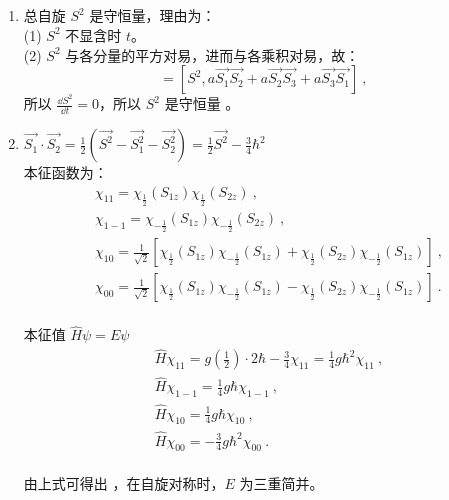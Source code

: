 \subsection{ }
\begin{enumerate}
\item 总自旋 $S^2$ 是守恒量，理由为：\\
(1) $S^2$ 不显含时 $t$。\\
(2) $S^2$ 与各分量的平方对易，进而与各乘积对易，故：\\
\begin{equation}
[S^2 ,H^2] = [S^2 , a \vec{S_1} \vec{S_2} + a \vec{S_2} \vec{S_3} + a \vec{S_3} \vec{S_1}]~,
\end{equation}
所以 $\frac{\dd{S^2}}{\dd{t}}=0$，所以 $S^2$ 是守恒量 。

\item $\displaystyle \vec{S_1} \cdot \vec{S_2} = \frac{1}{2} (\vec{S^2} -\vec{S^2_1} -\vec{S^2_2}) = \frac{1}{2} \vec{S^2} - \frac{3}{4} \hbar^2 $ \\

本征函数为：\\
\begin{equation}
\begin{aligned}
& \chi_{11} = \chi_{\frac{1}{2}}(S_{1z})\chi_{\frac{1}{2}}(S_{2z})~, \\
& \chi_{1-1} = \chi_{-\frac{1}{2}}(S_{1z})\chi_{-\frac{1}{2}}(S_{2z}) ~,\\
& \chi_{10} = \frac{1}{\sqrt{2}} \left[ \chi_{\frac{1}{2}}(S_{1z})\chi_{-\frac{1}{2}}(S_{1z}) + \chi_{\frac{1}{2}}(S_{2z})\chi_{-\frac{1}{2}}(S_{1z}) \right]~, \\
& \chi_{00} = \frac{1}{\sqrt{2}} \left[ \chi_{\frac{1}{2}}(S_{1z})\chi_{-\frac{1}{2}}(S_{1z}) - \chi_{\frac{1}{2}}(S_{2z})\chi_{-\frac{1}{2}}(S_{1z}) \right] ~. \\
\end{aligned}
\end{equation}

本征值 $\hat{H}\psi = E\psi $ \\
\begin{equation}
\begin{aligned}
& \hat{H}\chi_{11} = g(\frac{1}{2}) \cdot 2\hbar - \frac{3}{4} \chi_{11} = \frac{1}{4}g\hbar^{2} \chi_{11}~,  \\
& \hat{H}\chi_{1-1} = \frac{1}{4}g\hbar \chi_{1-1} ~, \\
& \hat{H}\chi_{10} = \frac{1}{4}g\hbar \chi_{10} ~, \\
& \hat{H}\chi_{00} = -\frac{3}{4}g\hbar^{2} \chi_{00}  ~.\\
\end{aligned}
\end{equation}

由上式可得出 ，在自旋对称时，$E$ 为三重简并。
\end{enumerate}
